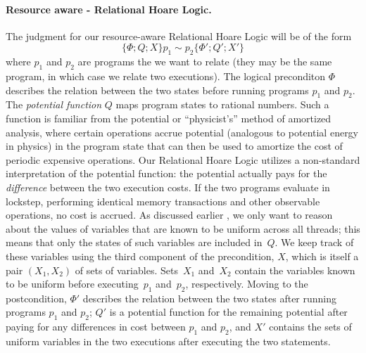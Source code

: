 \paragraph{Resource aware - Relational Hoare Logic.}
The judgment for our resource-aware Relational Hoare Logic will be of the form 
%
\[\{\Phi; Q; X\} p_1 \sim p_2 \{\Phi'; Q'; X'\}\]
%
where $p_1$ and $p_2$ are programs the we want to relate (they may be the same program, in which case we relate two executions).%
The logical preconditon $\Phi$  describes the relation between the two states before running programs $p_1$ and $p_2$. 
%
The {\em potential function} $Q$ maps program states to rational numbers.
%
Such a function is familiar from the potential or ``physicist's'' method of amortized analysis, where certain operations accrue potential (analogous to potential energy in physics) in the program state that can then be used to amortize the cost of periodic expensive operations.
%
Our Relational Hoare Logic utilizes a non-standard interpretation of the potential function: the potential actually pays for the {\em difference} between the two execution costs.
%
If the two programs evaluate in lockstep, performing identical memory transactions and other observable operations, no cost is accrued.
%
As discussed earlier , we only want to reason about the values of variables that are known to be uniform across all threads; this means that only the states of such variables are included in~$Q$.
%
We keep track of these variables using the third component of the precondition, $X$, which is itself a pair $(X_1, X_2)$ of sets of variables.
%
Sets~$X_1$ and~$X_2$ contain the variables known to be uniform before executing~$p_1$ and~$p_2$, respectively.
%
Moving to the postcondition, $\Phi'$ describes the relation between the two states after running programs $p_1$ and $p_2$; $Q'$ is a potential function for the remaining potential after paying for any differences in cost between $p_1$ and $p_2$, and $X'$ contains the sets of uniform variables in the two executions after executing the two statements.

